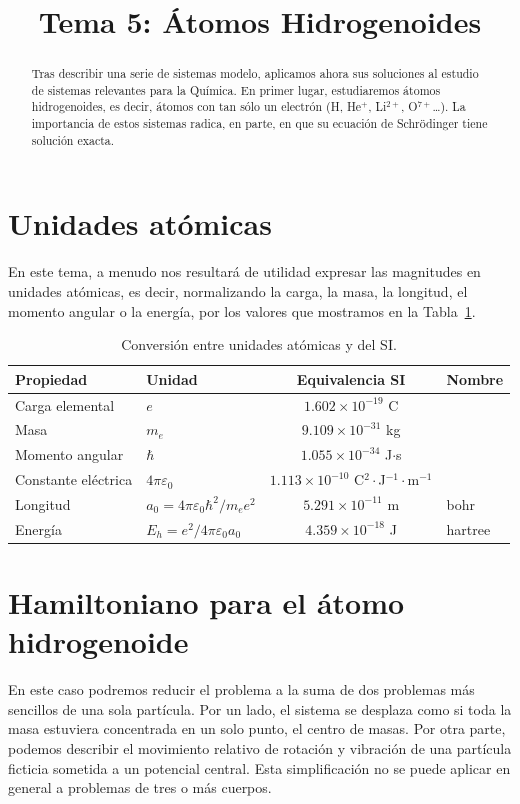 \documentclass{tufte-handout}
\title[Química Física II: Tema 5 - Átomos hidrogenoides]{
Tema 5: Átomos Hidrogenoides}
\date{}  %
\begin{document}
\maketitle%

\begin{abstract}
\noindent Tras describir una serie de sistemas modelo, aplicamos ahora
sus soluciones al estudio de sistemas relevantes para la Química. En primer lugar, estudiaremos 
átomos hidrogenoides, es decir, átomos con tan sólo un
electrón (H, He$^+$, Li$^{2+}$, O$^{7+}$\ldots). La importancia
de estos sistemas radica, en parte, en que su ecuación de
Schrödinger tiene solución exacta.
\end{abstract}


\section{Unidades atómicas}
En este tema, a menudo nos resultará de utilidad expresar las 
magnitudes en unidades atómicas, es decir, normalizando la carga, 
la masa, la longitud, el momento angular o la energía, por los 
valores que mostramos en la Tabla~\ref{tb:au}.

\begin{table}[h!]
    \centering
    \small{}
    \setlength{\tabcolsep}{3pt}
    \begin{tabular}{|l|l|c|l|}
    \hline
         Propiedad & Unidad & Equivalencia SI& Nombre  \\
    \hline
    \hline
         Carga elemental & $e$ & $1.602\times10^{-19}$ C & \\ 
         Masa & $m_e$ & $9.109\times10^{-31}$ kg & \\ 
         Momento angular & $\hbar$ & $1.055\times10^{-34}$ J$\cdot$s & \\ 
         Constante eléctrica & $4\pi \varepsilon_0$ & $1.113\times10^{-10}$ C$^2\cdot$J$^{-1}\cdot$m$^{-1}$ & \\
         Longitud & $a_0=4\pi \varepsilon_0\hbar^2/m_ee^2$ & $5.291\times10^{-11}$ m & bohr \\ 
         Energía & $E_h=e^2/4\pi \varepsilon_0a_0$  & $4.359\times10^{-18}$ J & hartree \\ 
    \hline
    \end{tabular}
    \caption{Conversión entre unidades atómicas y del SI.}
    \label{tb:au}
\end{table}

\section{Hamiltoniano para el átomo hidrogenoide}
En este caso podremos reducir el problema a la suma de dos problemas 
más sencillos de una sola partícula. Por un lado, el sistema se 
desplaza como si toda la masa estuviera concentrada en un solo punto,
el centro de masas. Por otra parte, podemos describir el movimiento 
relativo de rotación y vibración de una partícula ficticia sometida 
a un potencial central. Esta simplificación no se puede aplicar en 
general a problemas de tres o más cuerpos.
\end{document}
